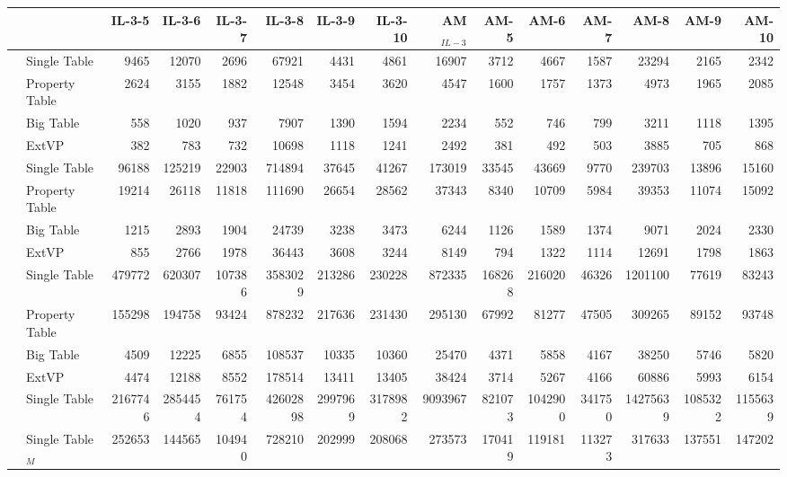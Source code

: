\documentclass[
  a4paper,
  12pt,
  oneside,
  parskip=half,
  headsepline,
]{scrartcl}
\begin{document}
\begin{table*}[htb]
  	\begin{tabular*}{\textwidth}{ ll @{\extracolsep{\fill}} rrrrrrrrrrrrr }
		\midrule
	  	& & IL-3-5 & IL-3-6 & IL-3-7 & IL-3-8 & IL-3-9 & IL-3-10 & AM$_{IL-3}$ & AM-5 & AM-6 & AM-7 & AM-8 & AM-9 & AM-10  \\
		\midrule
		\multirow{4}{*}{\rotatebox{90}{SF10}}
		& Single Table & 9465 & 12070 & 2696 & 67921 & 4431 & 4861 & 16907 & 3712 & 4667 & 1587 & 23294 & 2165 & 2342 \\
		& Property Table & 2624 & 3155 & 1882 & 12548 & 3454 & 3620 & 4547 & 1600 & 1757 & 1373 & 4973 & 1965 & 2085 \\
		& Big Table & 558 & 1020 & 937 & 7907 & 1390 & 1594 & 2234 & 552 & 746 & 799 & 3211 & 1118 & 1395 \\
		& ExtVP & 382 & 783 & 732 & 10698 & 1118 & 1241 & 2492 & 381 & 492 & 503 & 3885 & 705 & 868 \\
		\midrule
		\multirow{4}{*}{\rotatebox{90}{SF100}}
		& Single Table & 96188 & 125219 & 22903 & 714894 & 37645 & 41267 & 173019 & 33545 & 43669 & 9770 & 239703 & 13896 & 15160 \\
		& Property Table & 19214 & 26118 & 11818 & 111690 & 26654 & 28562 & 37343 & 8340 & 10709 & 5984 & 39353 & 11074 & 15092 \\
		& Big Table & 1215 & 2893 & 1904 & 24739 & 3238 & 3473 & 6244 & 1126 & 1589 & 1374 & 9071 & 2024 & 2330 \\
		& ExtVP & 855 & 2766 & 1978 & 36443 & 3608 & 3244 & 8149 & 794 & 1322 & 1114 & 12691 & 1798 & 1863 \\
		\midrule
		\multirow{4}{*}{\rotatebox{90}{SF1000}}
		& Single Table & 479772 & 620307 & 107386 & 3583029 & 213286 & 230228 & 872335 & 168268 & 216020 & 46326 & 1201100 & 77619 & 83243 \\
		& Property Table & 155298 & 194758 & 93424 & 878232 & 217636 & 231430 & 295130 & 67992 & 81277 & 47505 & 309265 & 89152 & 93748 \\
		& Big Table & 4509 & 12225 & 6855 & 108537 & 10335 & 10360 & 25470 & 4371 & 5858 & 4167 & 38250 & 5746 & 5820 \\
		& ExtVP & 4474 & 12188 & 8552 & 178514 & 13411 & 13405 & 38424 & 3714 & 5267 & 4166 & 60886 & 5993 & 6154 \\
		\midrule
		\multirow{7}{*}{\rotatebox{90}{SF10000}}
		& Single Table & 2167746 & 2854454 & 761754 & 42602898 & 2997969 & 3178982 & 9093967 & 821073 & 1042900 & 341750 & 14275639 & 1085322 & 1155639 \\
		& Single Table$_M$ & 252653 & 144565 & 104940 & 728210 & 202999 & 208068 & 273573 & 170419 & 119181 & 113273 & 317633 & 137551 & 147202 \\

\end{tabular*}
\end{table*}
\end{document}
